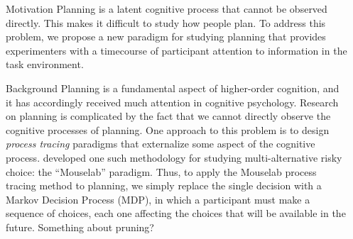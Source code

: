 \documentclass[final]{beamer}
\newlength{\sepwid}
\newlength{\onecolwid}
\begin{document}
\begin{frame}[t, fragile] %
\begin{columns}[t] %
\begin{column}{\sepwid}\end{column} %


\begin{column}{\onecolwid} %
  \begin{block}{Motivation}\label{Motivation}
    Planning is a latent cognitive process that cannot be observed directly. This makes it difficult to study how people plan.
    To address this problem, we propose a new paradigm for studying planning that provides experimenters with a timecourse of participant attention to information in the task environment. 
  \end{block}


  \begin{block}{Background}\label{Background}
    Planning is a fundamental aspect of higher-order cognition, and it has accordingly received much attention in cognitive psychology.
    Research on planning is complicated by the fact that we cannot directly observe the cognitive processes of planning.
    One approach to this problem is to design \emph{process tracing} paradigms that externalize some aspect of the cognitive process.  developed one such methodology for studying multi-alternative risky choice: the ``Mouselab'' paradigm.
    Thus, to apply the Mouselab process tracing method to planning, we simply replace the single decision with a Markov Decision Process (MDP), in which a participant must make a sequence of choices, each one affecting the choices that will be available in the future.
    Something about pruning?
  \end{block}


\end{column}
\end{columns}
\end{frame}
\end{document}

